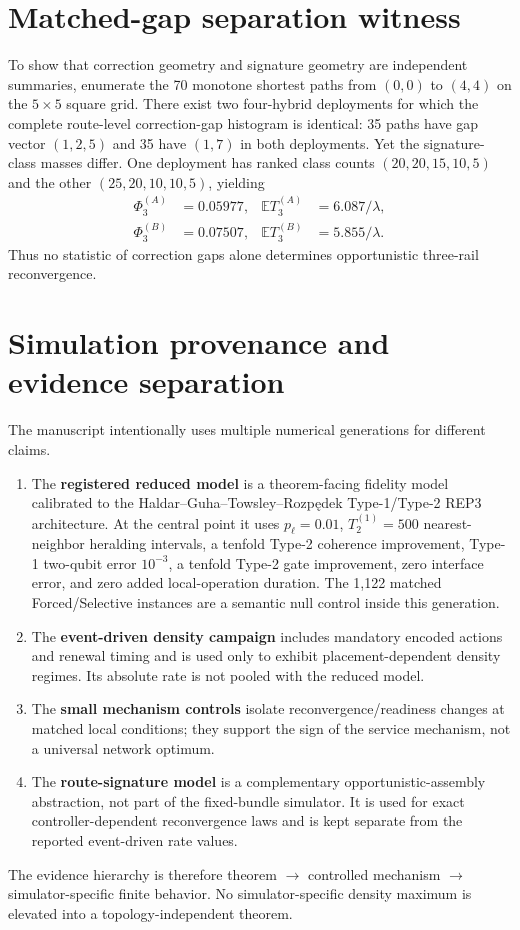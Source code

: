 \documentclass[aps,prx,preprint,superscriptaddress,nofootinbib,longbibliography]{revtex4-2}
\newcommand{\E}{\mathbb E}\newcommand{\Prob}{\mathbb P}
\begin{document}
\section{Matched-gap separation witness}
To show that correction geometry and signature geometry are independent summaries, enumerate the 70 monotone shortest paths from $(0,0)$ to $(4,4)$ on the $5\times5$ square grid. There exist two four-hybrid deployments for which the complete route-level correction-gap histogram is identical: 35 paths have gap vector $(1,2,5)$ and 35 have $(1,7)$ in both deployments. Yet the signature-class masses differ. One deployment has ranked class counts $(20,20,15,10,5)$ and the other $(25,20,10,10,5)$, yielding
\begin{align}
\Phi_3^{(A)}&=0.05977, & \E T_3^{(A)}&=6.087/\lambda,\\
\Phi_3^{(B)}&=0.07507, & \E T_3^{(B)}&=5.855/\lambda.
\end{align}
Thus no statistic of correction gaps alone determines opportunistic three-rail reconvergence.

\section{Simulation provenance and evidence separation}
The manuscript intentionally uses multiple numerical generations for different claims.
\begin{enumerate}
\item The \textbf{registered reduced model} is a theorem-facing fidelity model calibrated to the Haldar--Guha--Towsley--Rozp\k{e}dek Type-1/Type-2 REP3 architecture. At the central point it uses $p_\ell=0.01$, $T_2^{(1)}=500$ nearest-neighbor heralding intervals, a tenfold Type-2 coherence improvement, Type-1 two-qubit error $10^{-3}$, a tenfold Type-2 gate improvement, zero interface error, and zero added local-operation duration. The 1,122 matched Forced/Selective instances are a semantic null control inside this generation.
\item The \textbf{event-driven density campaign} includes mandatory encoded actions and renewal timing and is used only to exhibit placement-dependent density regimes. Its absolute rate is not pooled with the reduced model.
\item The \textbf{small mechanism controls} isolate reconvergence/readiness changes at matched local conditions; they support the sign of the service mechanism, not a universal network optimum.
\item The \textbf{route-signature model} is a complementary opportunistic-assembly abstraction, not part of the fixed-bundle simulator. It is used for exact controller-dependent reconvergence laws and is kept separate from the reported event-driven rate values.
\end{enumerate}
The evidence hierarchy is therefore theorem $\rightarrow$ controlled mechanism $\rightarrow$ simulator-specific finite behavior. No simulator-specific density maximum is elevated into a topology-independent theorem.
\end{document}
